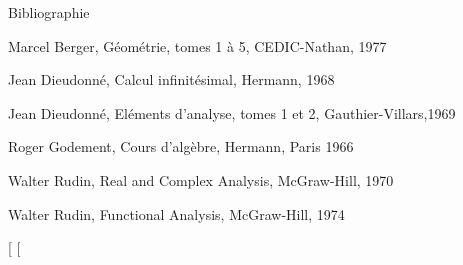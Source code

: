 \documentclass[]{article}
\begin{document}
Bibliographie

Marcel Berger, Géométrie, tomes 1 à 5, CEDIC-Nathan, 1977

Jean Dieudonné, Calcul infinitésimal, Hermann, 1968

Jean Dieudonné, Eléments d'analyse, tomes 1 et 2, Gauthier-Villars,1969

Roger Godement, Cours d'algèbre, Hermann, Paris 1966

Walter Rudin, Real and Complex Analysis, McGraw-Hill, 1970

Walter Rudin, Functional Analysis, McGraw-Hill, 1974

{[}
{[}
\end{document}
